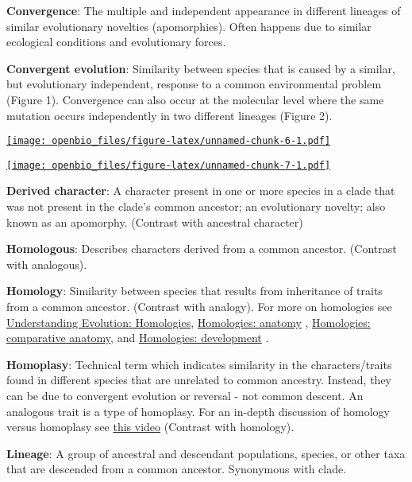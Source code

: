 \documentclass[
]{book}
\begin{document}
\textbf{Convergence}: The multiple and independent appearance in different lineages of similar evolutionary novelties (apomorphies). Often happens due to similar ecological conditions and evolutionary forces.

\textbf{Convergent evolution}: Similarity between species that is caused by a similar, but evolutionary independent, response to a common environmental problem (Figure 1). Convergence can also occur at the molecular level where the same mutation occurs independently in two different lineages (Figure 2).

\href{https://wp.biologos.org/wp-content/uploads/2018/10/venema_23_1.jpg}{\texttt{[image: openbio\_files/figure-latex/unnamed-chunk-6-1.pdf]}}

\href{https://wp.biologos.org/wp-content/uploads/2018/10/venema_22_7.jpg}{\texttt{[image: openbio\_files/figure-latex/unnamed-chunk-7-1.pdf]}}

\textbf{Derived character}: A character present in one or more species in a clade that was not present in the clade's common ancestor; an evolutionary novelty; also known as an apomorphy. (Contrast with ancestral character)

\textbf{Homologous}: Describes characters derived from a common ancestor. (Contrast with analogous).

\textbf{Homology}: Similarity between species that results from inheritance of traits from a common ancestor. (Contrast with analogy). For more on homologies see \href{https://evolution.berkeley.edu/evolibrary/article/0_0_0/lines_04}{Understanding Evolution: Homologies}, \href{https://evolution.berkeley.edu/evolibrary/article/0_0_0/lines_05}{Homologies: anatomy} , \href{https://evolution.berkeley.edu/evolibrary/article/0_0_0/lines_06}{Homologies: comparative anatomy}, and \href{https://evolution.berkeley.edu/evolibrary/article/0_0_0/lines_07}{Homologies: development} .

\textbf{Homoplasy}: Technical term which indicates similarity in the characters/traits found in different species that are unrelated to common ancestry. Instead, they can be due to convergent evolution or reversal - not common descent. An analogous trait is a type of homoplasy. For an in-depth discussion of homology versus homoplasy see \href{https://www.youtube.com/watch?v=W-APHQ94gog}{this video} (Contrast with homology).

\textbf{Lineage}: A group of ancestral and descendant populations, species, or other taxa that are descended from a common ancestor. Synonymous with clade.
\end{document}
